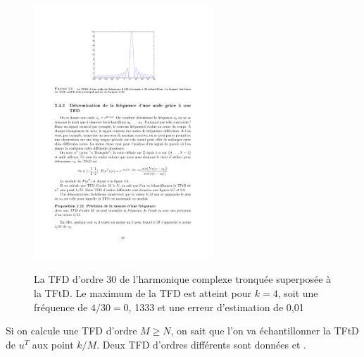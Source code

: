 \begin{figure}
  \centering
  \includegraphics[width=0.6\textwidth]{Figures/Figure2-6}\\
  \caption{La TFD d'ordre 30 de l'harmonique complexe tronqu\'{e}e superpos\'{e}e \`{a} la TFtD. Le maximum de la TFD est atteint pour $k=4$, soit une fr\'{e}quence de $4/30=0$, 1333 et une erreur d'estimation de 0,01}\label{fig:figure2-6}
\end{figure}


Si on calcule une TFD d'ordre $M\geq N$, on sait que l'on va \'{e}chantillonner la TFtD de $u^{T}$ aux point $k/M$. Deux TFD d'ordres diff\'{e}rents sont donn\'{e}es  et .


